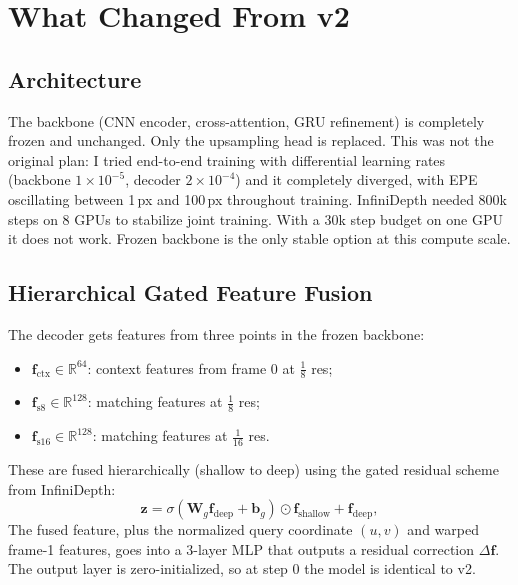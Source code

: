 \documentclass[conference]{IEEEtran}
\begin{document}
\section{What Changed From v2}

\subsection{Architecture}

The backbone (CNN encoder, cross-attention, GRU refinement) is completely frozen and unchanged. Only the upsampling head is replaced. This was not the original plan: I tried end-to-end training with differential learning rates (backbone $1 \times 10^{-5}$, decoder $2 \times 10^{-4}$) and it completely diverged, with EPE oscillating between 1\,px and 100\,px throughout training. InfiniDepth needed 800k steps on 8 GPUs to stabilize joint training. With a 30k step budget on one GPU it does not work. Frozen backbone is the only stable option at this compute scale.

\subsection{Hierarchical Gated Feature Fusion}

The decoder gets features from three points in the frozen backbone:
\begin{itemize}
    \item $\mathbf{f}_{\text{ctx}} \in \mathbb{R}^{64}$: context features from frame 0 at $\tfrac{1}{8}$ res;
    \item $\mathbf{f}_{\text{s8}} \in \mathbb{R}^{128}$: matching features at $\tfrac{1}{8}$ res;
    \item $\mathbf{f}_{\text{s16}} \in \mathbb{R}^{128}$: matching features at $\tfrac{1}{16}$ res.
\end{itemize}
These are fused hierarchically (shallow to deep) using the gated residual scheme from InfiniDepth:
\begin{equation}
    \mathbf{z} = \sigma(\mathbf{W}_g \mathbf{f}_{\text{deep}} + \mathbf{b}_g) \odot \mathbf{f}_{\text{shallow}} + \mathbf{f}_{\text{deep}},
\end{equation}
The fused feature, plus the normalized query coordinate $(u, v)$ and warped frame-1 features, goes into a 3-layer MLP that outputs a residual correction $\Delta\mathbf{f}$. The output layer is zero-initialized, so at step 0 the model is identical to v2.
\end{document}
